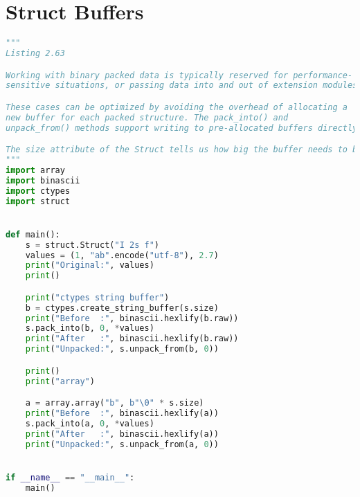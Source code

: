 \documentclass[a4paper,landscape]{report}
\begin{document}
\section{Struct Buffers}
\begin{lstlisting}[language=Python]
"""
Listing 2.63

Working with binary packed data is typically reserved for performance-
sensitive situations, or passing data into and out of extension modules.

These cases can be optimized by avoiding the overhead of allocating a
new buffer for each packed structure. The pack_into() and
unpack_from() methods support writing to pre-allocated buffers directly

The size attribute of the Struct tells us how big the buffer needs to be
"""
import array
import binascii
import ctypes
import struct


def main():
    s = struct.Struct("I 2s f")
    values = (1, "ab".encode("utf-8"), 2.7)
    print("Original:", values)
    print()

    print("ctypes string buffer")
    b = ctypes.create_string_buffer(s.size)
    print("Before  :", binascii.hexlify(b.raw))
    s.pack_into(b, 0, *values)
    print("After   :", binascii.hexlify(b.raw))
    print("Unpacked:", s.unpack_from(b, 0))

    print()
    print("array")

    a = array.array("b", b"\0" * s.size)
    print("Before  :", binascii.hexlify(a))
    s.pack_into(a, 0, *values)
    print("After   :", binascii.hexlify(a))
    print("Unpacked:", s.unpack_from(a, 0))


if __name__ == "__main__":
    main()

\end{lstlisting}
\end{document}
